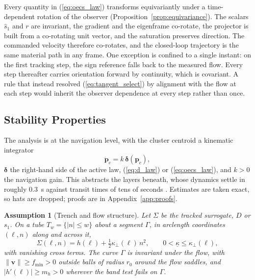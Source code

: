 \documentclass[lettersize,journal]{IEEEtran}
\newtheorem{assumption}{Assumption}
\begin{document}
Every quantity in (\ref{eq:oecs_law}) transforms equivariantly under a
time-dependent rotation of the observer
(Proposition~\ref{prop:equivariance}). The scalars $\hat{s}_1$ and $r$
are invariant, the gradient and the eigenframe co-rotate, the projector
is built from a co-rotating unit vector, and the saturation preserves
direction. The commanded velocity therefore co-rotates, and the
closed-loop trajectory is the same material path in any frame. One
exception is confined to a single instant: on the first tracking step,
the sign reference falls back to the measured flow. Every step
thereafter carries orientation forward by continuity, which is
covariant. A rule that instead resolved (\ref{eq:tangent_select}) by
alignment with the flow at each step would inherit the observer
dependence at every step rather than once.

\subsection{Stability Properties}
\label{sec:stability}

The analysis is at the navigation level, with the cluster centroid a
kinematic integrator
\begin{equation}
    \dot{\mathbf{p}}_c = k\,\boldsymbol{\delta}(\mathbf{p}_c),
    \label{eq:kinematic_model}
\end{equation}
$\boldsymbol{\delta}$ the right-hand side of the active law,
(\ref{eq:d_law}) or (\ref{eq:oecs_law}), and $k > 0$ the navigation
gain. This abstracts the layers beneath, whose dynamics settle in
roughly 0.3~s against transit times of tens of seconds \cite{14}.
Estimates are taken exact, so hats are dropped; proofs are in
Appendix~\ref{app:proofs}.

\begin{assumption}[Trench and flow structure]
\label{ass:trench}
Let $\Sigma$ be the tracked surrogate, $D$ or $s_1$. On a tube $T_w =
\{|n| \leq w\}$ about a segment $\Gamma$, in arclength coordinates
$(\ell, n)$ along and across it,
\begin{equation}
    \Sigma(\ell, n) = h(\ell)
        + \tfrac{1}{2}\kappa_\perp(\ell)\,n^2,
    \qquad 0 < \underline{\kappa} \leq \kappa_\perp(\ell),
    \label{eq:normal_form}
\end{equation}
with vanishing cross terms. The curve $\Gamma$ is invariant under the
flow, with $\lVert\mathbf{v}\rVert \geq f_{\min} > 0$ outside balls of
radius $r_0$ around the flow saddles, and $|h'(\ell)| \geq m_h > 0$
wherever the band test fails on $\Gamma$.
\end{assumption}
\end{document}
